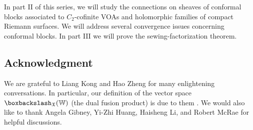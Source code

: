 \documentclass[11pt,b5paper,notitlepage]{article}
\theoremstyle{definition}
\theoremstyle{plain}
\newcommand{\Wbb}{\mathbb W}
\newcommand{\<}{\left\langle}
\renewcommand{\>}{\right\rangle}
\newcommand{\fx}{\mathfrak{X}}
\newcommand{\bbs}{\boxbackslash}
\numberwithin{equation}{subsection}
\begin{document}
In part II of this series, we will study the connections on sheaves of conformal blocks associated to $C_2$-cofinite VOAs and holomorphic families of compact Riemann surfaces. We will address several convergence issues concerning conformal blocks. In part III we will prove the sewing-factorization theorem.


\subsection*{Acknowledgment}


We are grateful to Liang Kong and Hao Zheng for many enlightening conversations. In particular, our definition of the vector space $\bbs_\fx(\Wbb)$ (the dual fusion product) is due to them \cite{KZ-conformal-block}. We would also like to thank Angela Gibney, Yi-Zhi Huang, Haisheng Li, and Robert McRae for helpful discussions.
\end{document}
